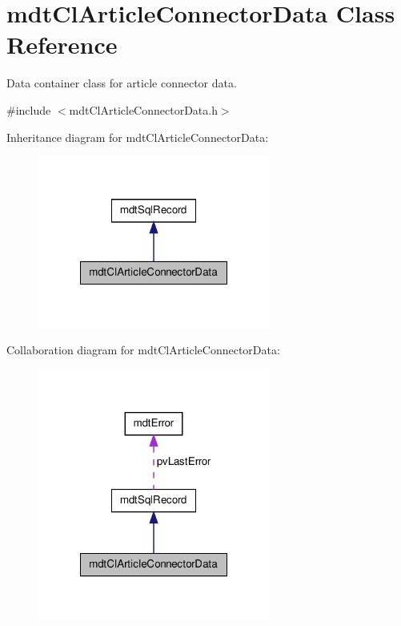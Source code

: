 \hypertarget{classmdt_cl_article_connector_data}{\section{mdt\-Cl\-Article\-Connector\-Data Class Reference}
\label{classmdt_cl_article_connector_data}
}


Data container class for article connector data.  




{\ttfamily \#include $<$mdt\-Cl\-Article\-Connector\-Data.\-h$>$}



Inheritance diagram for mdt\-Cl\-Article\-Connector\-Data\-:\nopagebreak
\begin{figure}[H]
\begin{center}
\leavevmode
\includegraphics[width=216pt]{classmdt_cl_article_connector_data__inherit__graph}
\end{center}
\end{figure}


Collaboration diagram for mdt\-Cl\-Article\-Connector\-Data\-:\nopagebreak
\begin{figure}[H]
\begin{center}
\leavevmode
\includegraphics[width=216pt]{classmdt_cl_article_connector_data__coll__graph}
\end{center}
\end{figure}
